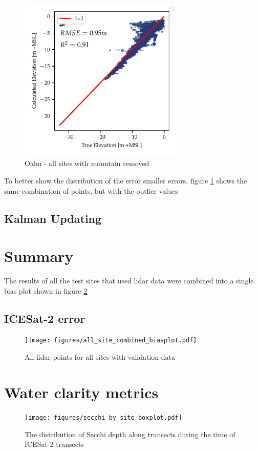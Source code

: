 \begin{figure}[h]
    \centering
    \includegraphics[width=0.7\textwidth]{figures/Oahu_combined_mountains_removed_lidar_estimated_vs_truth.pdf}
    \caption{Oahu - all sites with mountain removed}
    \label{fig:oahu-bias-no-mountains}
\end{figure}

To better show the distribution of the error smaller errors, figure \ref{fig:oahu-bias-no-mountains} shows the same combination of points, but with the outlier values 

\subsection{Kalman Updating}

\section{Summary}
The results of all the test sites that used lidar data were combined into a single bias plot shown in figure \ref{fig:all-sites-biasplot}

\subsection{ICESat-2 error}

\begin{figure}[h]
    \centering
    \texttt{[image: figures/all\_site\_combined\_biasplot.pdf]}
    \caption{All lidar points for all sites with validation data}
    \label{fig:all-sites-biasplot}
\end{figure}

\section{Water clarity metrics}


\begin{figure}[ht]
    \centering
    \texttt{[image: figures/secchi\_by\_site\_boxplot.pdf]}
    \caption{The distribution of Secchi depth along transects during the time of ICESat-2 transects}
    \label{fig:secchi-boxplot}
\end{figure}

